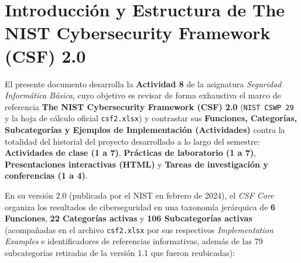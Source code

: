 \documentclass[letterpaper,11pt]{article}
\begin{document}


\newpage
{\hypersetup{linkcolor=black}\tableofcontents}

\newpage
\setcounter{page}{1}
\singlespacing

\section{Introducción y Estructura de The NIST Cybersecurity Framework (CSF) 2.0}

El presente documento desarrolla la \textbf{Actividad 8} de la asignatura \textit{Seguridad Informática Básica}, cuyo objetivo es revisar de forma exhaustiva el marco de referencia \textbf{The NIST Cybersecurity Framework (CSF) 2.0} (\texttt{NIST CSWP 29} y la hoja de cálculo oficial \texttt{csf2.xlsx}) \autocite{nist-csf-20} y contrastar sus \textbf{Funciones, Categorías, Subcategorías y Ejemplos de Implementación (Actividades)} contra la totalidad del historial del proyecto desarrollado a lo largo del semestre: \textbf{Actividades de clase (1 a 7)}, \textbf{Prácticas de laboratorio (1 a 7)}, \textbf{Presentaciones interactivas (HTML)} y \textbf{Tareas de investigación y conferencias (1 a 4)}.

En su versión 2.0 (publicada por el NIST en febrero de 2024), el \textit{CSF Core} organiza los resultados de ciberseguridad en una taxonomía jerárquica de \textbf{6 Funciones}, \textbf{22 Categorías activas} y \textbf{106 Subcategorías activas} (acompañadas en el archivo \texttt{csf2.xlsx} por sus respectivos \textit{Implementation Examples} e identificadores de referencias informativas, además de las 79 subcategorías retiradas de la versión 1.1 que fueron reubicadas):
\end{document}
